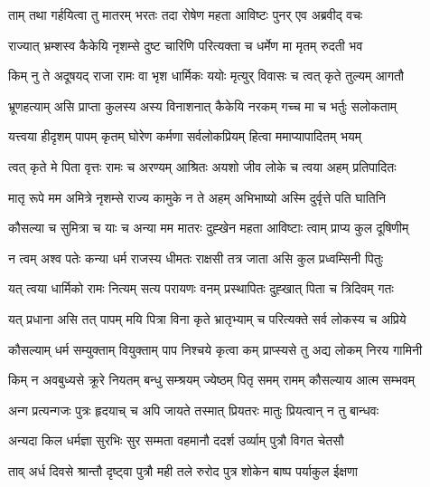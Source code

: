 
\twolineshloka
{ताम् तथा गर्हयित्वा तु मातरम् भरतः तदा}
{रोषेण महता आविष्टः पुनर् एव अब्रवीद् वचः} %

\twolineshloka
{राज्यात् भ्रम्शस्व कैकेयि नृशम्से दुष्ट चारिणि}
{परित्यक्ता च धर्मेण मा मृतम् रुदती भव} %

\twolineshloka
{किम् नु ते अदूषयद् राजा रामः वा भृश धार्मिकः}
{ययोः मृत्युर् विवासः च त्वत् कृते तुल्यम् आगतौ} %

\twolineshloka
{भ्रूणहत्याम् असि प्राप्ता कुलस्य अस्य विनाशनात्}
{कैकेयि नरकम् गच्च मा च भर्तुः सलोकताम्} %

\twolineshloka
{यत्त्वया हीदृशम् पापम् कृतम् घोरेण कर्मणा}
{सर्वलोकप्रियम् हित्वा ममाप्यापादितम् भयम्} %

\twolineshloka
{त्वत् कृते मे पिता वृत्तः रामः च अरण्यम् आश्रितः}
{अयशो जीव लोके च त्वया अहम् प्रतिपादितः} %

\twolineshloka
{मातृ रूपे मम अमित्रे नृशम्से राज्य कामुके}
{न ते अहम् अभिभाष्यो अस्मि दुर्वृत्ते पति घातिनि} %

\twolineshloka
{कौसल्या च सुमित्रा च याः च अन्या मम मातरः}
{दुह्खेन महता आविष्टाः त्वाम् प्राप्य कुल दूषिणीम्} %

\twolineshloka
{न त्वम् अश्व पतेः कन्या धर्म राजस्य धीमतः}
{राक्षसी तत्र जाता असि कुल प्रध्वम्सिनी पितुः} %

\twolineshloka
{यत् त्वया धार्मिको रामः नित्यम् सत्य परायणः}
{वनम् प्रस्थापितः दुह्खात् पिता च त्रिदिवम् गतः} %

\twolineshloka
{यत् प्रधाना असि तत् पापम् मयि पित्रा विना कृते}
{भ्रातृभ्याम् च परित्यक्ते सर्व लोकस्य च अप्रिये} %

\twolineshloka
{कौसल्याम् धर्म सम्युक्ताम् वियुक्ताम् पाप निश्चये}
{कृत्वा कम् प्राप्स्यसे तु अद्य लोकम् निरय गामिनी} %

\twolineshloka
{किम् न अवबुध्यसे क्रूरे नियतम् बन्धु सम्श्रयम्}
{ज्येष्ठम् पितृ समम् रामम् कौसल्याय आत्म सम्भवम्} %

\twolineshloka
{अन्ग प्रत्यन्गजः पुत्रः हृदयाच् च अपि जायते}
{तस्मात् प्रियतरः मातुः प्रियत्वान् न तु बान्धवः} %

\twolineshloka
{अन्यदा किल धर्मज्ञा सुरभिः सुर सम्मता}
{वहमानौ ददर्श उर्व्याम् पुत्रौ विगत चेतसौ} %

\twolineshloka
{ताव् अर्ध दिवसे श्रान्तौ दृष्ट्वा पुत्रौ मही तले}
{रुरोद पुत्र शोकेन बाष्प पर्याकुल ईक्षणा} %

